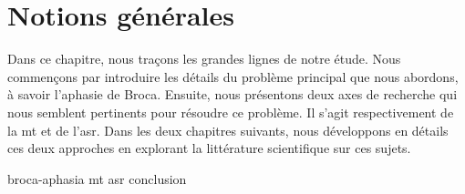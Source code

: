 \chapter{Notions générales}%
\label{chap.general_notions}

Dans ce chapitre, nous traçons les grandes lignes de notre étude.
Nous commençons par introduire les détails du problème principal que nous abordons, à savoir l'aphasie de Broca.
Ensuite, nous présentons deux axes de recherche qui nous semblent pertinents pour résoudre ce problème.
Il s'agit respectivement de la \gls{mt} et de l'\gls{asr}.
Dans les deux chapitres suivants, 
nous développons en détails ces deux approches
en explorant la littérature scientifique sur ces sujets.

{broca-aphasia}
{mt}
{asr}
{conclusion}